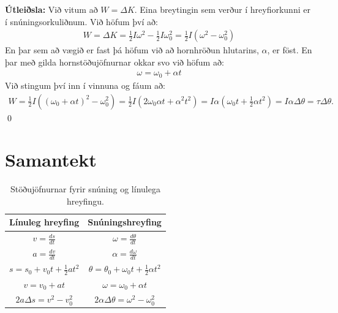 \ifdefined \wholebook \else\documentclass[oneside]{book}\usepackage{EdlBook}\graphicspath{{figures/}}
\begin{document}
\textbf{Útleiðsla:} Við vitum að $W = \Delta K$. Eina breytingin sem verður í hreyfiorkunni er í snúningsorkuliðnum. Við höfum því að:
\begin{align*}
    W = \Delta K = \frac{1}{2}I \omega^2 - \frac{1}{2}I\omega_0^2 = \frac{1}{2}I\left( \omega^2 - \omega_0^2 \right)
\end{align*}
En þar sem að vægið er fast þá höfum við að hornhröðun hlutarins, $\alpha$, er föst. En þar með gilda hornstöðujöfnurnar okkar svo við höfum að:
\begin{align*}
    \omega = \omega_0 + \alpha t
\end{align*}
Við stingum því inn í vinnuna og fáum að:
\begin{align*}
    W = \frac{1}{2}I\left( (\omega_0 + \alpha t)^2 - \omega_0^2 \right) = \frac{1}{2}I \left( 2\omega_0 \alpha t + \alpha^2 t^2 \right) = I\alpha \left( \omega_0 t + \frac{1}{2}\alpha t^2 \right) = I\alpha \Delta \theta = \tau \Delta \theta.
\end{align*}
\qed


\section*{Samantekt}

\begin{table}[H]
\begin{center}
\begin{tabular}{|c|c|}
\hline
\textbf{Línuleg hreyfing} & \textbf{Snúningshreyfing} \\
\hline
$v = \frac{ds}{dt} $ & $\omega = \frac{d\theta}{dt}$ \\
$a = \frac{dv}{dt} $ & $\alpha = \frac{d\omega}{dt}$ \\
$s = s_0 + v_0t + \frac{1}{2}at^2 $ & $\theta = \theta_0 + \omega_0 t + \frac{1}{2}\alpha t^2$ \\
$v = v_0 + a t$ & $\omega = \omega_0 + \alpha t$ \\
$2a \Delta s = v^2 - v_0^2$ & $2 \alpha \Delta \theta = \omega^2 - \omega_0^2$  \\
\hline
\end{tabular}
\caption{Stöðujöfnurnar fyrir snúning og línulega hreyfingu.}
\label{tafla:raddi}
\end{center}
\end{table}
\end{document}
